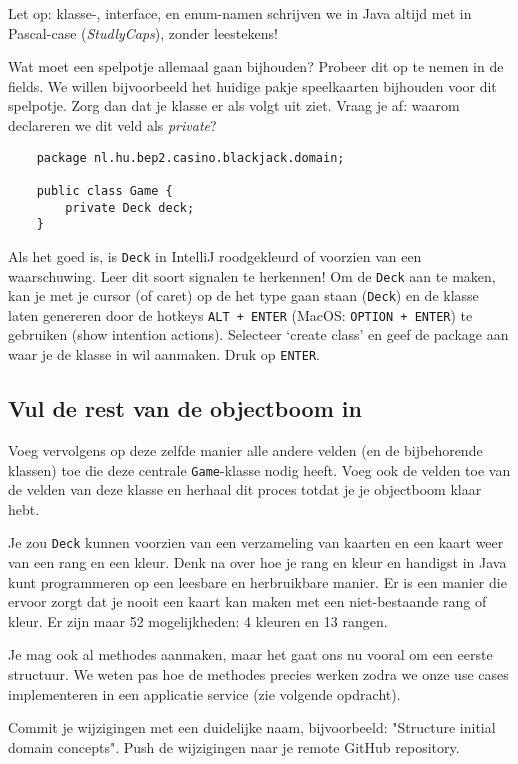 Let op: klasse-, interface, en enum-namen schrijven we in Java altijd met in Pascal-case 
(\textit{StudlyCaps}), zonder leestekens!

Wat moet een spelpotje allemaal gaan bijhouden? Probeer dit op te nemen in de fields.
We willen bijvoorbeeld het huidige pakje speelkaarten bijhouden voor dit spelpotje.
Zorg dan dat je klasse er als volgt uit ziet. Vraag je af: waarom declareren we dit veld als \textit{private}?

\begin{verbatim}
    package nl.hu.bep2.casino.blackjack.domain;

    public class Game {
        private Deck deck;
    }
\end{verbatim}

Als het goed is, is \texttt{Deck} in IntelliJ roodgekleurd 
of voorzien van een waarschuwing. Leer dit soort signalen te herkennen!
Om de \texttt{Deck} aan te maken, kan je met je cursor (of caret) op de het
type gaan staan (\texttt{Deck}) en de klasse laten genereren door de hotkeys
\texttt{ALT + ENTER} (MacOS: \texttt{OPTION + ENTER}) te gebruiken 
(show intention actions). Selecteer `create class' en geef de package aan 
waar je de klasse in wil aanmaken. Druk op \texttt{ENTER}.

\subsection{Vul de rest van de objectboom in}
Voeg vervolgens op deze zelfde manier alle andere velden (en de bijbehorende klassen) toe 
die deze centrale \texttt{Game}-klasse nodig heeft.
Voeg ook de velden toe van de velden van deze klasse en herhaal dit proces totdat
je je objectboom klaar hebt.

Je zou \texttt{Deck} kunnen voorzien van een verzameling van kaarten 
en een kaart weer van een rang en een kleur. Denk na over hoe je rang en kleur en 
handigst in Java kunt programmeren op een leesbare en herbruikbare manier.
Er is een manier die ervoor zorgt dat je nooit een kaart kan maken met een niet-bestaande 
rang of kleur. Er zijn maar 52 mogelijkheden: 4 kleuren en 13 rangen.

Je mag ook al methodes aanmaken, maar het gaat ons nu vooral om een eerste structuur.
We weten pas hoe de methodes precies werken zodra we onze use cases implementeren 
in een applicatie service (zie volgende opdracht).

Commit je wijzigingen met een duidelijke naam, 
bijvoorbeeld: "Structure initial domain concepts". 
Push de wijzigingen naar je remote GitHub repository.

